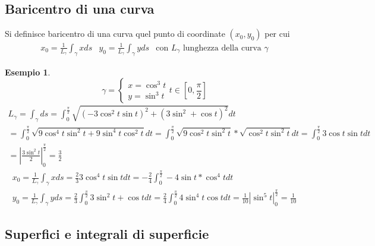\documentclass{book}
\newtheorem{esempio}{Esempio}
\begin{document}
\subsection{Baricentro di una curva}
Si definisce {\color{red} baricentro di una curva} quel punto di coordinate
$(x_0,y_0)$ per cui
\begin{equation*}
	\begin{matrix}
		x_0=\frac{1}{L_\gamma}\int_\gamma x ds & y_0=\frac{1}{L_\gamma}
		\int_\gamma yds & \text{con $L_\gamma$ lunghezza della curva $\gamma$}
	\end{matrix}
\end{equation*}
\begin{esempio}
	\begin{equation*}
		\gamma=\begin{cases}
			x=\cos^3t\\
			y=\sin^3 t
		\end{cases} t\in \left[0,\frac{\pi}{2}\right]
	\end{equation*}
	\begin{equation*}
		\begin{matrix}
				L_\gamma=\int_{\gamma}ds=\int_{0}^{\frac{\pi}{2}}\sqrt{(-3\cos^2t\sin
			t)^2+(3\sin^2+\cos t)^2} dt\\
			=\int_{0}^{\frac{\pi}{2}}\sqrt{9\cos^4t\sin^2t+9\sin^4t\cos^2t}dt= 
			\int_{0}^{\frac{\pi}{2}}\sqrt{9\cos^2t\sin^2t}*\sqrt{\cos^2t\sin^2t}
			dt = \int_{0}^{\frac{\pi}{2}}3\cos t\sin t dt\\=\left|
			\frac{3\sin^2t}{2}\right|_{0}^{\frac{\pi}{2}}=\frac{3}{2}
		\end{matrix}
	\end{equation*}
	\begin{equation*}
		\begin{matrix}
			x_0=\frac{1}{L_\gamma}\int_\gamma xds=\frac{2}{3}3\cos^4t\sin tdt=
			-\frac{2}{4}\int_{0}^{\frac{\pi}{2}}-4\sin t*\cos^4tdt\\
			y_0=\frac{1}{L_\gamma}\int_\gamma
			yds=\frac{2}{3}\int_{0}^{\frac{\pi}{2}}3\sin^2t+\cos t
			dt=\frac{2}{4}\int_{0}^{\frac{\pi}{2}}4\sin^4t\cos t
			dt=\frac{1}{10} \left|\sin^5t\right|_0^{\frac{\pi}{2}}=\frac{1}{10}
		\end{matrix}
	\end{equation*}
\end{esempio}
\subsection{Superfici e integrali di superficie}
\end{document}
